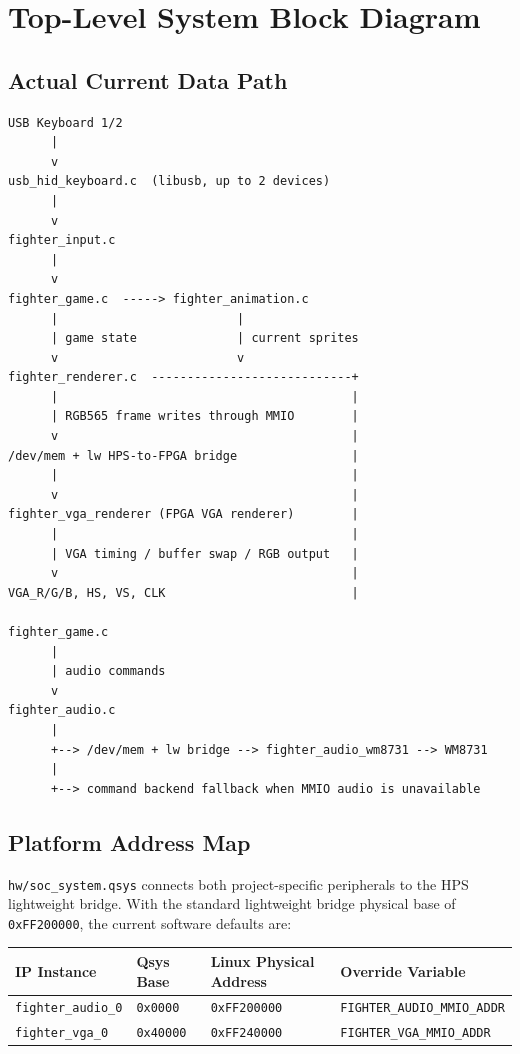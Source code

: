\documentclass[12pt,a4paper]{article}
\begin{document}
\section{Top-Level System Block Diagram}

\subsection{Actual Current Data Path}

\begin{lstlisting}[style=fighterstyle]
USB Keyboard 1/2
      |
      v
usb_hid_keyboard.c  (libusb, up to 2 devices)
      |
      v
fighter_input.c
      |
      v
fighter_game.c  -----> fighter_animation.c
      |                         |
      | game state              | current sprites
      v                         v
fighter_renderer.c  ----------------------------+
      |                                         |
      | RGB565 frame writes through MMIO        |
      v                                         |
/dev/mem + lw HPS-to-FPGA bridge                |
      |                                         |
      v                                         |
fighter_vga_renderer (FPGA VGA renderer)        |
      |                                         |
      | VGA timing / buffer swap / RGB output   |
      v                                         |
VGA_R/G/B, HS, VS, CLK                          |

fighter_game.c
      |
      | audio commands
      v
fighter_audio.c
      |
      +--> /dev/mem + lw bridge --> fighter_audio_wm8731 --> WM8731
      |
      +--> command backend fallback when MMIO audio is unavailable
\end{lstlisting}

\subsection{Platform Address Map}

\texttt{hw/soc\_system.qsys} connects both project-specific peripherals to
the HPS lightweight bridge. With the standard lightweight bridge physical
base of \texttt{0xFF200000}, the current software defaults are:

\begin{longtable}{>{\raggedright\arraybackslash}p{} >{\raggedright\arraybackslash}p{} >{\raggedright\arraybackslash}p{} >{\raggedright\arraybackslash}p{}}
\toprule
IP Instance & Qsys Base & Linux Physical Address & Override Variable \\
\midrule
\endhead
\texttt{fighter\_audio\_0} & \texttt{0x0000} & \texttt{0xFF200000} & \texttt{FIGHTER\_AUDIO\_MMIO\_ADDR} \\
\texttt{fighter\_vga\_0} & \texttt{0x40000} & \texttt{0xFF240000} & \texttt{FIGHTER\_VGA\_MMIO\_ADDR} \\
\bottomrule
\end{longtable}
\end{document}
